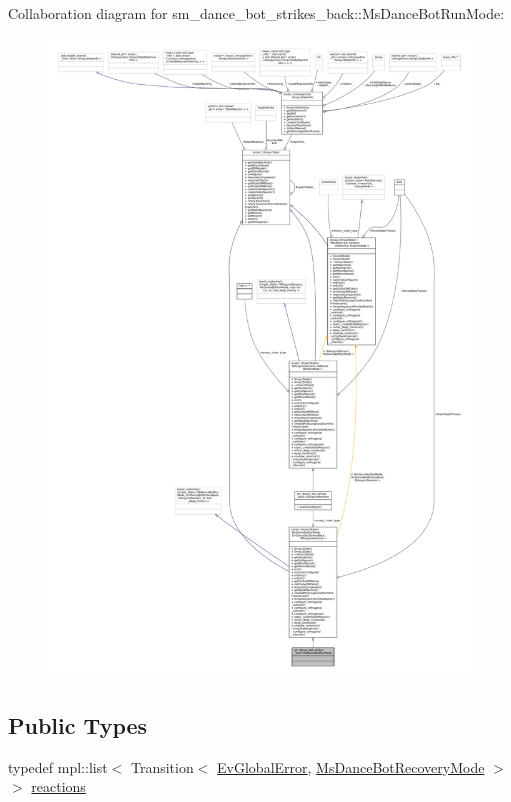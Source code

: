 Collaboration diagram for sm\+\_\+dance\+\_\+bot\+\_\+strikes\+\_\+back\+:\+:Ms\+Dance\+Bot\+Run\+Mode\+:
\nopagebreak
\begin{figure}[H]
\begin{center}
\leavevmode
\includegraphics[width=350pt]{classsm__dance__bot__strikes__back_1_1MsDanceBotRunMode__coll__graph}
\end{center}
\end{figure}
\subsection*{Public Types}
\begin{DoxyCompactItemize}
\item 
typedef mpl\+::list$<$ Transition$<$ \hyperlink{structsm__dance__bot__strikes__back_1_1EvGlobalError}{Ev\+Global\+Error}, \hyperlink{classsm__dance__bot__strikes__back_1_1MsDanceBotRecoveryMode}{Ms\+Dance\+Bot\+Recovery\+Mode} $>$ $>$ \hyperlink{classsm__dance__bot__strikes__back_1_1MsDanceBotRunMode_a49adec1999b0fa5c7b67d8b503cae711}{reactions}
\end{DoxyCompactItemize}
